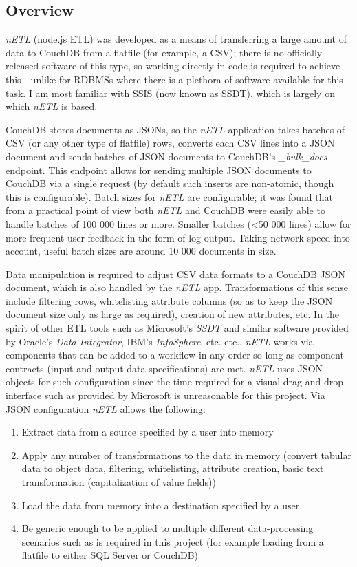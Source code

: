 \subsection{Overview}
\textit{nETL} (node.js ETL) was developed as a means of transferring a large amount of data to CouchDB from a flatfile (for example, a CSV); there is no officially released software of this type, so working directly in code is required to achieve this - unlike for RDBMSs where there is a plethora of software available for this task. I am most familiar with SSIS (now known as SSDT). which is largely on which \textit{nETL} is based.

CouchDB stores documents as JSONs, so the \textit{nETL} application takes batches of CSV (or any other type of flatfile) rows, converts each CSV lines into a JSON document and sends batches of JSON documents to CouchDB's \textit{_bulk_docs} endpoint. This endpoint allows for sending multiple JSON documents to CouchDB via a single request (by default such inserts are non-atomic, though this is configurable). Batch sizes for \textit{nETL} are configurable; it was found that from a practical point of view both \textit{nETL} and CouchDB were easily able to handle batches of 100 000 lines or more. Smaller batches (\textless 50 000 lines) allow for more frequent user feedback in the form of log output. Taking network speed into account, useful batch sizes are around 10 000 documents in size.

Data manipulation is required to adjust CSV data formats to a CouchDB JSON document, which is also handled by the \textit{nETL} app. Transformations of this sense include filtering rows, whitelisting attribute columns (so as to keep the JSON document size only as large as required), creation of new attributes, etc. In the spirit of other ETL tools such as Microsoft's \textit{SSDT} and similar software provided by Oracle's \textit{Data Integrator}, IBM's \textit{InfoSphere}, etc. etc., \textit{nETL} works via components that can be added to a workflow in any order so long as component contracts (input and output data specifications) are met. \textit{nETL} uses JSON objects for such configuration since the time required for a visual drag-and-drop interface such as provided by Microsoft is unreasonable for this project. Via JSON configuration \textit{nETL} allows the following:

\begin{enumerate}
    \item Extract data from a source specified by a user into memory
    \item Apply any number of transformations to the data in memory (convert tabular data to object data, filtering, whitelisting, attribute creation, basic text transformation (capitalization of value fields))
    \item Load the data from memory into a destination specified by a user
    \item Be generic enough to be applied to multiple different data-processing scenarios such as is required in this project (for example loading from a flatfile to either SQL Server or CouchDB)
\end{enumerate}